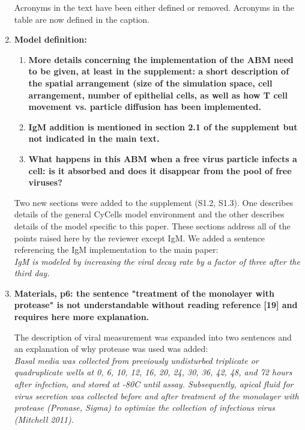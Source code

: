 \documentclass[10pt]{article}
\begin{document}
\begin{enumerate}
Acronyms in the text have been either defined or removed.  Acronyms in the table are now defined in the caption. \\


\item \textbf{Model definition:}
\begin{enumerate}
   \item \textbf{More details concerning the implementation of the ABM need to be given, at least in the supplement: a short description of the spatial arrangement (size of the simulation space, cell arrangement, number of epithelial cells, as well as how T cell movement vs. particle diffusion has been implemented.}
  
   \item \textbf{IgM addition is mentioned in section 2.1 of the supplement but not indicated in the main text.}
   
   \item \textbf{What happens in this ABM when a free virus particle infects a cell: is it absorbed and does it disappear from the pool of free viruses?}
   
  
\end{enumerate}       

Two new sections were added to the supplement (S1.2, S1.3).  One describes details of the general CyCells model environment and the other describes details of the model specific to this paper.  These sections address all of the points raised here by the reviewer except IgM.     We added a sentence referencing the IgM implementation to the main paper: \\

\textit{IgM is modeled by increasing the viral decay rate by a factor of three after the third day.} \\

\item \textbf{Materials, p6: the sentence "treatment of the monolayer with protease" is not understandable without reading reference [19] and requires here more explanation.}

The description of viral measurement was expanded into two sentences and an explanation of why protease was used was added: \\

\textit{Basal media was collected from previously undisturbed triplicate or quadruplicate wells at 0, 6, 10, 12, 16, 20, 24, 30, 36, 42, 48, and 72 hours after infection, and stored at -80C until assay.  Subsequently, apical fluid for virus secretion was collected before and after treatment of the monolayer with protease (Pronase, Sigma) to optimize the collection of infectious virus (Mitchell 2011).} \\



\end{enumerate}
\end{document}
